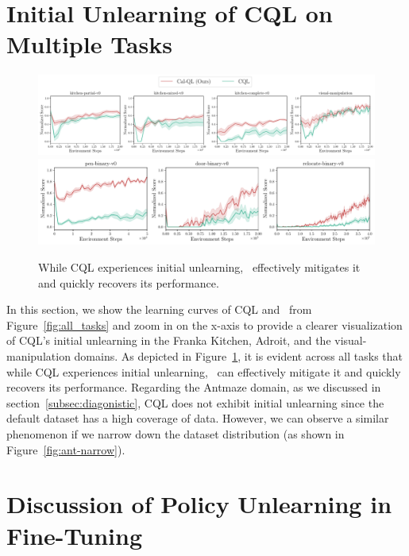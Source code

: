\section{Initial Unlearning of CQL on Multiple Tasks}
\label{app:cql_dip_zoom_in}
\begin{figure}[b]
\vspace{-0.5cm}

\begin{center}    
{\includegraphics[clip,width=1\linewidth]{figs-sample/kitchen-cog-zoom-in.pdf}} {\includegraphics[clip,width=0.75\linewidth]{figs-sample/adroit-zoom-in.pdf}}
\end{center}
\vspace{-0.45cm}
\caption{\label{fig:dip_zoom} \footnotesize{While CQL experiences initial unlearning, \methodname\ effectively mitigates it and quickly recovers its performance.}}
\vspace{-0.6cm}
\end{figure}
In this section, we show the learning curves of CQL and \methodname\ from Figure~\ref{fig:all_tasks} and zoom in on the x-axis to provide a clearer visualization of CQL's initial unlearning in the Franka Kitchen, Adroit, and the visual-manipulation domains. As depicted in Figure~\ref{fig:dip_zoom}, it is evident across all tasks that while CQL experiences initial unlearning, \methodname\ can effectively mitigate it and quickly recovers its performance. Regarding the Antmaze domain, as we discussed in section~\ref{subsec:diagonistic}, CQL does not exhibit initial unlearning since the default dataset has a high coverage of data. However, we can observe a similar phenomenon if we narrow down the dataset distribution (as shown in Figure~\ref{fig:ant-narrow}).




\iffalse

\section{Discussion of Policy Unlearning in Fine-Tuning}

